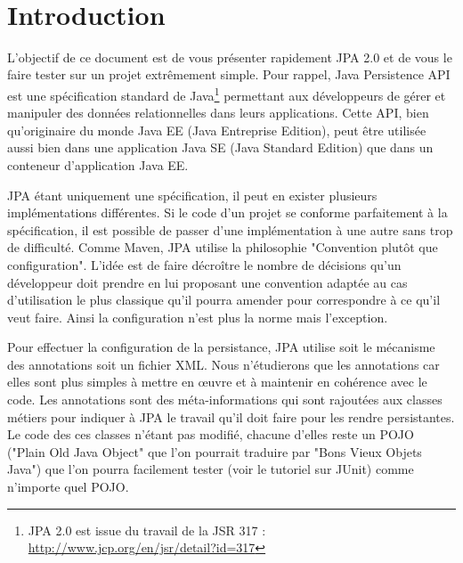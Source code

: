 \documentclass[a4paper,11pt]{article}
\date{}
\begin{document}

{\centering
    \mbox{
    }
}\\[0.4cm]
\section{Introduction}
L'objectif de ce document est de vous présenter rapidement JPA 2.0 et de vous le faire tester sur un projet extrêmement 
simple. Pour rappel, Java Persistence API est une spécification standard de Java\footnote{JPA 2.0 est issue du travail de 
la JSR 317 : \url{http://www.jcp.org/en/jsr/detail?id=317}} permettant aux développeurs de gérer et manipuler des données 
relationnelles dans leurs applications. Cette API, bien qu'originaire du monde Java EE (Java Entreprise Edition), peut être 
utilisée aussi bien dans une application Java SE (Java Standard Edition) que dans un conteneur d'application Java EE.

JPA étant uniquement une spécification, il peut en exister plusieurs implémentations différentes. Si le code d'un projet
se conforme parfaitement à la spécification, il est possible de passer d'une implémentation à une autre sans trop de 
difficulté. Comme Maven, JPA utilise la philosophie "Convention plutôt que configuration". L'idée est de faire décroître 
le nombre de décisions qu'un développeur doit prendre en lui proposant une convention adaptée au cas d'utilisation 
le plus classique qu'il pourra amender pour correspondre à ce qu'il veut faire. Ainsi la configuration n'est plus la 
norme mais l'exception.

Pour effectuer la configuration de la persistance, JPA utilise soit le mécanisme des annotations soit un fichier XML.
Nous n'étudierons que les annotations car elles sont plus simples à mettre en œuvre et à maintenir en cohérence avec le 
code. Les annotations sont des méta-informations qui sont rajoutées aux classes métiers pour indiquer à JPA le travail qu'il 
doit faire pour les rendre persistantes. Le code des ces classes n'étant pas modifié, chacune d'elles reste un POJO 
("Plain Old Java Object" que l'on pourrait traduire par "Bons Vieux Objets Java") que l'on pourra facilement tester (voir 
le tutoriel sur JUnit) comme n'importe quel POJO.
\end{document}
